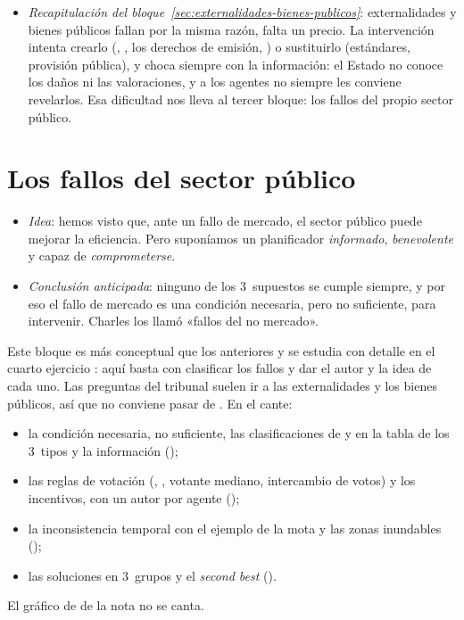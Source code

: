 \documentclass[11pt]{article}
\begin{document}
\begin{itemize}
\item \emph{Recapitulación del bloque~\ref{sec:externalidades-bienes-publicos}}: externalidades y bienes públicos fallan por la misma razón, falta un precio. La intervención intenta crearlo (, , los derechos de emisión, ) o sustituirlo (estándares, provisión pública), y choca siempre con la información: el Estado no conoce los daños ni las valoraciones, y a los agentes no siempre les conviene revelarlos. Esa dificultad nos lleva al tercer bloque: los fallos del propio sector público.
\end{itemize}


\section{Los fallos del sector público}\label{sec:fallos-sector-publico}

\begin{itemize}
\item \emph{Idea}: hemos visto que, ante un fallo de mercado, el sector público puede mejorar la eficiencia. Pero suponíamos un planificador \emph{informado}, \emph{benevolente} y capaz de \emph{comprometerse}.
\item \emph{Conclusión anticipada}: ninguno de los 3~supuestos se cumple siempre, y por eso el fallo de mercado es una condición necesaria, pero no suficiente, para intervenir. Charles \textcite{Wolf1979Theory} los llamó «fallos del no mercado».
\end{itemize}

\begin{notaopositor}
Este bloque es más conceptual que los anteriores y se estudia con detalle en el cuarto ejercicio : aquí basta con clasificar los fallos y dar el autor y la idea de cada uno. Las preguntas del tribunal suelen ir a las externalidades y los bienes públicos, así que no conviene pasar de . En el cante:
\begin{itemize}
\item la condición necesaria, no suficiente, las clasificaciones de  y  en la tabla de los 3~tipos y la información ();
\item las reglas de votación (, , votante mediano, intercambio de votos) y los incentivos, con un autor por agente ();
\item la inconsistencia temporal con el ejemplo de la mota y las zonas inundables ();
\item las soluciones en 3~grupos y el \emph{second best} ().
\end{itemize}
El gráfico de  de la nota no se canta.
\end{notaopositor}
\end{document}
